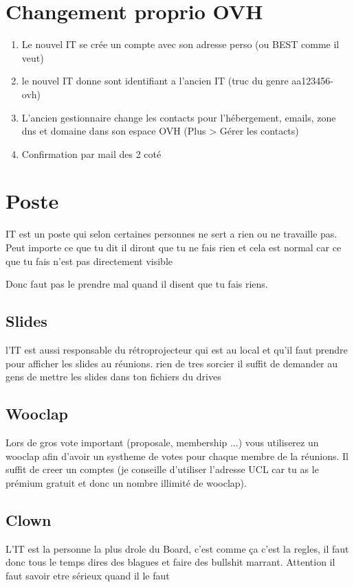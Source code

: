 \documentclass[12pt]{article}
\begin{document}
\section{Changement proprio OVH}
	\begin{enumerate}
		\item Le nouvel IT se crée un compte avec son adresse perso (ou BEST comme il veut)
		\item le nouvel IT donne sont identifiant a l'ancien IT (truc du genre aa123456-ovh)
		\item L’ancien gestionnaire change les contacts pour l’hébergement, emails, zone dns et domaine dans son espace OVH (Plus > Gérer les contacts)
		\item Confirmation par mail des 2 coté
	\end{enumerate}

\section{Poste}

	IT est un poste qui selon certaines personnes ne sert a rien ou ne travaille pas. Peut importe ce que tu dit il diront que tu ne fais rien et cela est normal car ce que tu fais n'est pas directement visible
	
	Donc faut pas le prendre mal quand il disent que tu fais riens.
	\subsection{Slides}
	
	l'IT est aussi responsable du rétroprojecteur qui est au local et qu'il faut prendre pour afficher les slides au réunions. rien de tres sorcier il suffit de demander au gens de mettre les slides dans ton fichiers du drives
	
	\subsection{Wooclap}
		Lors de gros vote important (proposale, membership ...) vous utiliserez un wooclap afin d'avoir un systheme de votes pour chaque membre de la réunions. Il suffit de creer un comptes (je conseille d'utiliser l'adresse UCL car tu as le prémium gratuit et donc un nombre illimité de wooclap).
		
	\subsection{Clown}
		L'IT est la personne la plus drole du Board, c'est comme ça c'est la regles, il faut donc tous le temps dires des blagues et faire des bullshit marrant. Attention il faut savoir etre sérieux quand il le faut
	
\end{document}

